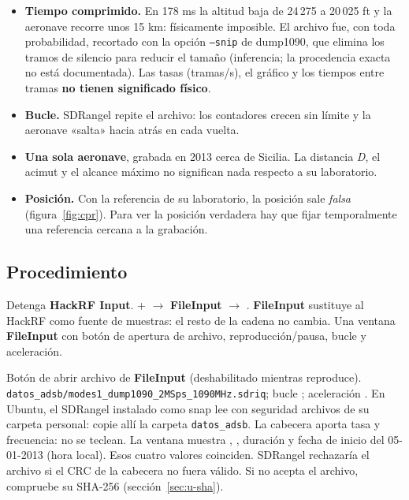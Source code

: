 \begin{importante}
\begin{itemize}
  \item \textbf{Tiempo comprimido.} En 178 ms la altitud baja de 24\,275 a 20\,025 ft y la aeronave recorre unos 15 km: físicamente imposible. El archivo fue, con toda probabilidad, recortado con la opción \texttt{--snip} de dump1090, que elimina los tramos de silencio para reducir el tamaño (inferencia; la procedencia exacta no está documentada). Las tasas (tramas/s), el gráfico y los tiempos entre tramas \textbf{no tienen significado físico}.
  \item \textbf{Bucle.} SDRangel repite el archivo: los contadores crecen sin límite y la aeronave «salta» hacia atrás en cada vuelta.
  \item \textbf{Una sola aeronave}, grabada en 2013 cerca de Sicilia. La distancia \emph{D}, el acimut y el alcance máximo no significan nada respecto a su laboratorio.
  \item \textbf{Posición.} Con la referencia de su laboratorio, la posición sale \emph{falsa} (figura~\ref{fig:cpr}). Para ver la posición verdadera hay que fijar temporalmente una referencia cercana a la grabación.
\end{itemize}
\end{importante}

\subsection{Procedimiento}

{Detenga \textbf{HackRF Input}. + $\rightarrow$ \textbf{FileInput} $\rightarrow$ .}
{}
{\textbf{FileInput} sustituye al HackRF como fuente de muestras: el resto de la cadena no cambia.}
{Una ventana \textbf{FileInput} con botón de apertura de archivo, reproducción/pausa, bucle y aceleración.}
{}
{}

{Botón de abrir archivo de \textbf{FileInput} (deshabilitado mientras reproduce).}
{\texttt{datos\_adsb/modes1\_dump1090\_2MSps\_1090MHz.sdriq}; bucle ; aceleración . En Ubuntu, el SDRangel instalado como snap lee con seguridad archivos de su carpeta personal: copie allí la carpeta \texttt{datos\_adsb}.}
{La cabecera aporta tasa y frecuencia: no se teclean.}
{La ventana muestra , , duración  y fecha de inicio del 05-01-2013 (hora local).}
{Esos cuatro valores coinciden. SDRangel rechazaría el archivo si el CRC de la cabecera no fuera válido.}
{Si no acepta el archivo, compruebe su SHA-256 (sección~\ref{sec:u-sha}).}

